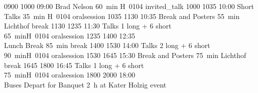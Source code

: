 \begin{timetable}
   {0900} {1000} {09:00 Brad Nelson}                 {60~min}                        {H~0104}                      {invited_talk}
   {1000} {1035} {10:00 Short Talks}                  {\vspace{1.5mm}35~min}          {\vspace{1.5mm}H~0104}        {oralsession}
   {1035} {1130} {10:35 Break and Posters}            {\vspace{1.5mm}55~min}          {\vspace{1.5mm}Lichthof}      {break}
   {1130} {1235} {11:30 Talks}                        {\vspace{-0.5em}1 long + 6 short\\65~min}{H~0104}             {oralsession}
   {1235} {1400} {12:35\\[0.2em]Lunch Break}          {85~min}                        {}                            {break}
   {1400} {1530} {14:00 Talks}                        {\vspace{-0.5em}2 long + 6 short\\90~min}{H~0104}             {oralsession}
   {1530} {1645} {15:30 Break and Posters}            {\vspace{1.5mm}75~min}          {\vspace{1.5mm}Lichthof}      {break}
   {1645} {1800} {16:45 Talks}                        {\vspace{-0.5em}1 long + 6 short\\75~min}{H~0104}             {oralsession}
   {1800} {2000} {18:00\\\vspace{0.3em}Buses Depart for Banquet}       {2~h}          {\vspace{-0.7em}at Kater Holzig}     {event}




\end{timetable}
